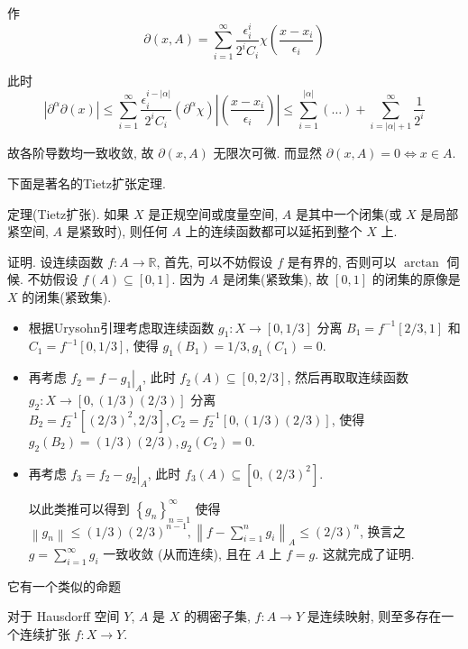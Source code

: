 \documentclass[options]{article}
\begin{document}
作
\[
		\partial(x, A)=\sum_{i=1}^{\infty} \frac{\epsilon_i^i}{2^i C_i}
		\chi\left(\frac{x-x_i}{\epsilon_i}\right)
\]

此时
\[
		\left|\partial^\alpha \partial(x)\right| \leq \sum_{i=1}^{\infty} \frac{\epsilon_i^{i-|\alpha|}}{2^i C_i}\left(\partial^\alpha \chi\right)\left|\left(\frac{x-x_i}{\epsilon_i}\right)\right| \leq
		\sum_{i=1}^{|\alpha|}(\ldots)+\sum_{i=|\alpha|+1}^{\infty} \frac{1}{2^i}
\]

故各阶导数均一致收敛, 故 $\partial(x, A)$ 无限次可微. 而显然 $\partial(x, A)=0 \Longleftrightarrow x \in A$.

\begin{remark}
	下面是著名的Tietz扩张定理.

	\hrulefill

	定理(Tietz扩张). 如果 $X$ 是正规空间或度量空间, $A$ 是其中一个闭集(或 $X$ 是局部紧空间, $A$ 是紧致时), 则任何 $A$ 上的连续函数都可以延拓到整个 $X$ 上.
\end{remark}

证明. 设连续函数 $f: A \rightarrow \mathbb{R}$, 首先, 可以不妨假设 $f$ 是有界的, 否则可以 $\arctan$ 伺候. 不妨假设 $f(A) \subseteq[0,1]$. 因为 $A$ 是闭集(紧致集), 故 $[0,1]$ 的闭集的原像是 $X$ 的闭集(紧致集).
\begin{itemize}
	\item 根据Urysohn引理考虑取连续函数 $g_1: X \rightarrow[0,1 / 3]$ 分离 $B_1=f^{-1}[2 / 3,1]$ 和 $C_1=f^{-1}[0,1 / 3]$, 使得 $g_1\left(B_1\right)=1 / 3, g_1\left(C_1\right)=0$.
	\item 再考虑 $f_2=f-\left.g_1\right|_A$, 此时 $f_2(A) \subseteq[0,2 / 3]$, 然后再取取连续函数 $g_2: X \rightarrow[0,(1 / 3)(2 / 3)]$ 分离 $B_2=f_2^{-1}\left[(2 / 3)^2, 2 / 3\right], C_2=f_2^{-1}[0,(1 / 3)(2 / 3)]$, 使得 $g_2\left(B_2\right)=(1 / 3)(2 / 3), g_2\left(C_2\right)=0$.
	\item 再考虑 $f_3=f_2-\left.g_2\right|_A$, 此时 $f_3(A) \subseteq\left[0,(2 / 3)^2\right]$.

			以此类推可以得到 $\left\{g_n\right\}_{n=1}^{\infty}$ 使得 $\left\|g_n\right\| \leq(1 / 3)(2 / 3)^{n-1},\left\|f-\sum_{i=1}^n g_i\right\|_A \leq(2 / 3)^n$, 换言之 $g=\sum_{i=1}^{\infty} g_i$ 一致收敛 (从而连续), 且在 $A$ 上 $f=g$. 这就完成了证明.
\end{itemize}
\begin{remark}
	它有一个类似的命题

	\hrulefill

	对于 Hausdorff 空间 $Y$, $A$ 是 $X$ 的稠密子集, $f\colon A\to Y$ 是连续映射, 则至多存在一个连续扩张 $f\colon X\to Y$.
\end{remark}
\end{document}
